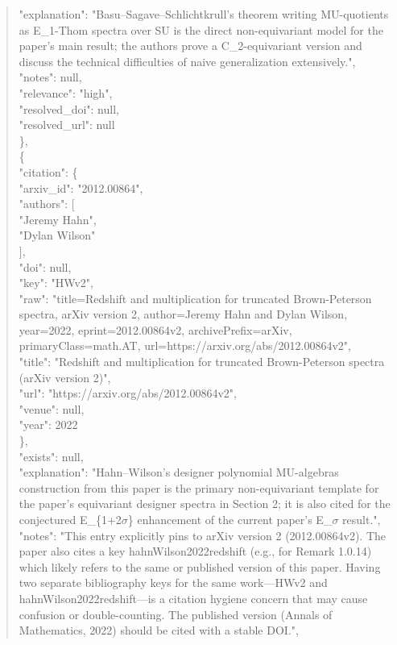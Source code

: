 \documentclass[11pt]{article}
\begin{document}
\begin{quote}
      "explanation": "Basu--Sagave--Schlichtkrull's theorem writing MU-quotients as E\_1-Thom spectra over SU is the direct non-equivariant model for the paper's main result; the authors prove a C\_2-equivariant version and discuss the technical difficulties of naive generalization extensively.",\\
      "notes": null,\\
      "relevance": "high",\\
      "resolved\_doi": null,\\
      "resolved\_url": null\\
    \},\\
    \{\\
      "citation": \{\\
        "arxiv\_id": "2012.00864",\\
        "authors": [\\
          "Jeremy Hahn",\\
          "Dylan Wilson"\\
        ],\\
        "doi": null,\\
        "key": "HWv2",\\
        "raw": "title=Redshift and multiplication for truncated Brown-Peterson spectra, arXiv version 2, author=Jeremy Hahn and Dylan Wilson, year=2022, eprint=2012.00864v2, archivePrefix=arXiv, primaryClass=math.AT, url=https://arxiv.org/abs/2012.00864v2",\\
        "title": "Redshift and multiplication for truncated Brown-Peterson spectra (arXiv version 2)",\\
        "url": "https://arxiv.org/abs/2012.00864v2",\\
        "venue": null,\\
        "year": 2022\\
      \},\\
      "exists": null,\\
      "explanation": "Hahn--Wilson's designer polynomial MU-algebras construction from this paper is the primary non-equivariant template for the paper's equivariant designer spectra in Section 2; it is also cited for the conjectured E\_\{1+2\ensuremath{\sigma}\} enhancement of the current paper's E\_\ensuremath{\sigma} result.",\\
      "notes": "This entry explicitly pins to arXiv version 2 (2012.00864v2). The paper also cites a key hahnWilson2022redshift (e.g., for Remark 1.0.14) which likely refers to the same or published version of this paper. Having two separate bibliography keys for the same work---HWv2 and hahnWilson2022redshift---is a citation hygiene concern that may cause confusion or double-counting. The published version (Annals of Mathematics, 2022) should be cited with a stable DOI.",\\

\end{quote}
\end{document}
